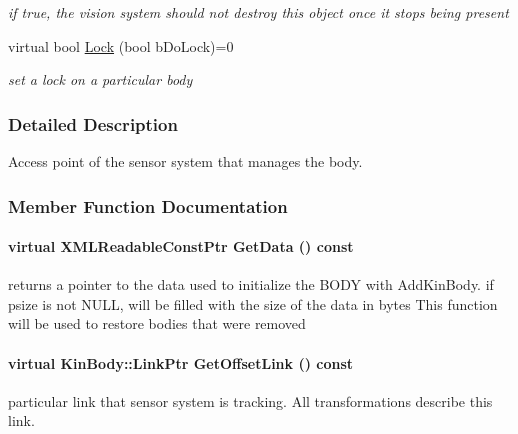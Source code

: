 \begin{DoxyCompactItemize}
\begin{DoxyCompactList}\small\item\em if true, the vision system should not destroy this object once it stops being present \item\end{DoxyCompactList}\item 
\hypertarget{classOpenRAVE_1_1KinBody_1_1ManageData_a652890825714be86dde479f3283e0978}{
virtual bool \hyperlink{classOpenRAVE_1_1KinBody_1_1ManageData_a652890825714be86dde479f3283e0978}{Lock} (bool bDoLock)=0}
\label{classOpenRAVE_1_1KinBody_1_1ManageData_a652890825714be86dde479f3283e0978}

\begin{DoxyCompactList}\small\item\em set a lock on a particular body \item\end{DoxyCompactList}\end{DoxyCompactItemize}


\subsubsection{Detailed Description}
Access point of the sensor system that manages the body. 

\subsubsection{Member Function Documentation}
\hypertarget{classOpenRAVE_1_1KinBody_1_1ManageData_aa6b2b0537af9c4f866af4d490825feb0}{
\paragraph[{GetData}]{\setlength{\rightskip}{0pt plus 5cm}virtual XMLReadableConstPtr GetData () const}\hfill}
\label{classOpenRAVE_1_1KinBody_1_1ManageData_aa6b2b0537af9c4f866af4d490825feb0}
returns a pointer to the data used to initialize the BODY with AddKinBody. if psize is not NULL, will be filled with the size of the data in bytes This function will be used to restore bodies that were removed \hypertarget{classOpenRAVE_1_1KinBody_1_1ManageData_ad37372e87ef720bad3b3fb5a58b5daf5}{
\paragraph[{GetOffsetLink}]{\setlength{\rightskip}{0pt plus 5cm}virtual KinBody::LinkPtr GetOffsetLink () const}\hfill}
\label{classOpenRAVE_1_1KinBody_1_1ManageData_ad37372e87ef720bad3b3fb5a58b5daf5}
particular link that sensor system is tracking. All transformations describe this link. 